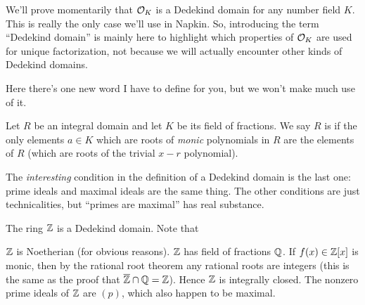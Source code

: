 \begin{remark}
	We'll prove momentarily that
	$\mathcal O_K$ is a Dedekind domain for any number field $K$.
	This is really the only case we'll use in Napkin.
	So, introducing the term ``Dedekind domain'' is mainly here to highlight
	which properties of $\mathcal O_K$ are used for unique factorization,
	not because we will actually encounter other kinds of Dedekind domains.
\end{remark}

Here there's one new word I have to define for you, but we won't make much use of it.
\begin{definition}
	Let $R$ be an integral domain and let $K$ be its field of fractions.
	We say $R$ is  if
	the only elements $a \in K$ which are roots of \emph{monic} polynomials in $R$
	are the elements of $R$ (which are roots of the trivial $x-r$ polynomial).
\end{definition}
The \emph{interesting} condition in the definition
of a Dedekind domain is the last one: prime ideals and maximal ideals
are the same thing.
The other conditions are just technicalities,
but ``primes are maximal'' has real substance.
\begin{example}
	The ring $\mathbb Z$ is a Dedekind domain.
	Note that
	\begin{itemize}
		\ii $\mathbb Z$ is Noetherian (for obvious reasons).
		\ii $\mathbb Z$ has field of fractions $\mathbb Q$.
		If $f(x) \in \mathbb Z[x]$ is monic, then by the rational root theorem
		any rational roots are integers
		(this is the same as the proof that $\overline{\mathbb Z} \cap \mathbb Q = \mathbb Z$).
		Hence $\mathbb Z$ is integrally closed.
		\ii The nonzero prime ideals of $\mathbb Z$ are $(p)$,
		which also happen to be maximal.
	\end{itemize}
\end{example}

